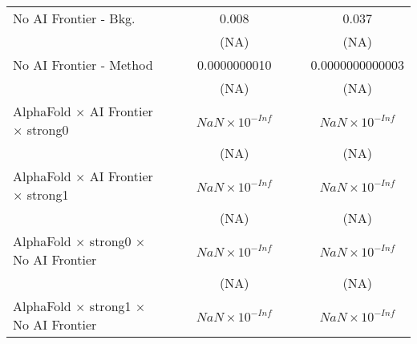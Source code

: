\begin{tabular}{lcccccc}
   No AI Frontier - Bkg.                                                      &                        &                        & 0.008                  &       &                        & 0.037\\   
                                                                              &                        &                        & (NA)                   &       &                        & (NA)\\   
   No AI Frontier - Method                                                    &                        &                        & 0.0000000010           &       &                        & 0.0000000000003\\   
                                                                              &                        &                        & (NA)                   &       &                        & (NA)\\   
   AlphaFold $\times$ AI Frontier $\times$ strong0                            &                        &                        & $NaN\times 10^{-Inf}$  &       &                        & $NaN\times 10^{-Inf}$\\    
                                                                              &                        &                        & (NA)                   &       &                        & (NA)\\   
   AlphaFold $\times$ AI Frontier $\times$ strong1                            &                        &                        & $NaN\times 10^{-Inf}$  &       &                        & $NaN\times 10^{-Inf}$\\    
                                                                              &                        &                        & (NA)                   &       &                        & (NA)\\   
   AlphaFold $\times$ strong0 $\times$ No AI Frontier                         &                        &                        & $NaN\times 10^{-Inf}$  &       &                        & $NaN\times 10^{-Inf}$\\    
                                                                              &                        &                        & (NA)                   &       &                        & (NA)\\   
   AlphaFold $\times$ strong1 $\times$ No AI Frontier                         &                        &                        & $NaN\times 10^{-Inf}$  &       &                        & $NaN\times 10^{-Inf}$\\    

\end{tabular}

